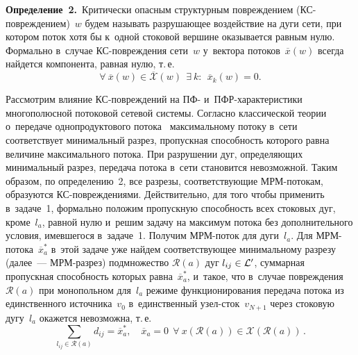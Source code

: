 \begin{multicols}{2}
\smallskip

\noindent
\textbf{Определение~2.}\
Критически опасным структурным по\-вреж\-де\-ни\-ем (КС-по\-вреж\-де\-ни\-ем)~$w$ 
будем называть разрушающее воздействие на дуги сети, при котором поток хотя 
бы к~одной стоковой вершине оказывается равным нулю. Формально в~случае 
КС-по\-вреж\-де\-ния сети~$w$ у~вектора потоков~$\overline {x}(w)$ 
всегда найдется компонента, равная нулю, т.\,е.
$$
\forall \ \overline {{x}}(w) \in \overline{\mathcal{X}}(w)\ \  \exists\ k:\ \
 \overline {x}_{k}(w) = 0.
 $$
 
 \smallskip

Рассмотрим влияние КС-по\-вреж\-де\-ний на ПФ- и~ПФР-ха\-рак\-те\-ри\-сти\-ки многополюсной 
потоковой сетевой системы.
Согласно классической тео\-рии\linebreak
 о~передаче однопродуктового  потока~\cite{ford} 
максимальному потоку в~сети соответствует минимальный разрез, 
пропускная способность которого\linebreak
 равна величине максимального потока. 
При разрушении дуг, определяющих минимальный разрез, передача потока в~сети 
становится невозможной. Таким образом,  по определению~2, все разрезы, 
соответствующие МРМ-по\-то\-кам, образуются КС-по\-вреж\-де\-ни\-ями.
Действительно, для того чтобы применить~\cite{ford} в~задаче~1, формально 
положим пропускную способность всех стоковых дуг, кроме~$l_a$, равной нулю и~решим 
задачу на максимум потока без дополнительного условия, имевшегося в~задаче~1. 
Получим МРМ-по\-ток для дуги~$l_a$.
Для МРМ-по\-то\-ка~$\overline {x}_a^*$ в~этой задаче уже найдем со\-от\-вет\-ст\-ву\-ющее  
минимальному разрезу (далее~--- МРМ-раз\-рез) подмножество $\mathcal{R}(a)$
дуг $l_{ij} \hm\in \mathcal{L}'$, суммарная пропускная способность которых 
равна~$\overline{x}_a^*$, и~такое, что в~случае по\-вреж\-де\-ния~$\mathcal{R}(a)$ 
при монопольном для~$l_a$ режиме функционирования передача потока из единственного 
источника~$v_0$ в~единственный узел-сток~$v_{N+1}$ через стоковую дугу~$l_a$ 
окажется невозможна, т.\,е.
$$
 \sum\limits_{l_{ij} \in \mathcal{R}(a)} d_{ij} = \overline {x}_a^*, \quad    
 \overline {x}_a = 0  \ \ \forall    
  \ {{x}}(\mathcal{R}(a)) \in \mathcal{X}(\mathcal{R}(a))\,.
  $$


\end{multicols}
